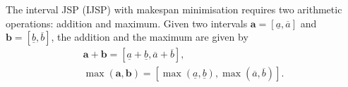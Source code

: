 \documentclass[icae]{iosart2x}
\begin{document}
The interval JSP (IJSP) with makespan minimisation requires two arithmetic operations: addition and maximum. Given two intervals $\mathbf{a}=[\underline{a},\overline{a}]$ and $\mathbf{b}=[\underline{b},\overline{b}]$, the addition and the maximum  are given by
\begin{gather}\label{eqSumAndMax}
\mathbf{a}+\mathbf{b}=[\underline{a}+\underline{b}, \overline{a}+\overline{b}],\\
\max(\mathbf{a},\mathbf{b})=[\max(\underline{a}, \underline{b}), \max(\overline{a}, \overline{b})].
\end{gather}
\end{document}
